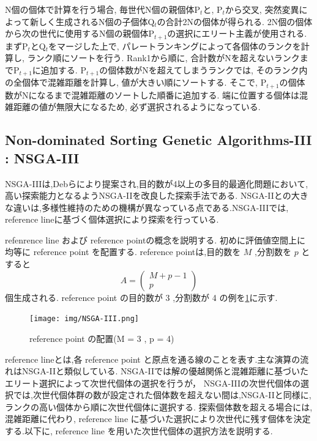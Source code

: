 \documentclass[12pt,a4j,notitlepage]{jreport}
\begin{document}
N個の個体で計算を行う場合, 毎世代N個の親個体P$_t$と, P$_t$から交叉, 突然変異によって新しく生成されるN個の子個体Q$_t$の合計2Nの個体が得られる.
2N個の個体から次の世代に使用するN個の親個体P$_{t+1}$の選択にエリート主義が使用される.
まずP$_t$とQ$_t$をマージした上で, パレートランキングによって各個体のランクを計算し, ランク順にソートを行う.
Rank1から順に, 合計数がNを超えないランクまでP$_{t+1}$に追加する.
P$_{t+1}$の個体数がNを超えてしまうランクでは, そのランク内の全個体で混雑距離を計算し, 値が大きい順にソートする.
そこで, P$_{t+1}$の個体数がNになるまで混雑距離のソートした順番に追加する.
端に位置する個体は混雑距離の値が無限大になるため, 必ず選択されるようになっている.

\subsection{Non-dominated Sorting Genetic Algorithms-III : NSGA-III}

NSGA-III\cite{Jain}は,Debらにより提案され,目的数が4以上の多目的最適化問題において,高い探索能力となるようNSGA-IIを改良した探索手法である.
NSGA-IIとの大きな違いは,多様性維持のための機構が異なっている点である.NSGA-IIIでは, reference lineに基づく個体選択により探索を行っている.

refenrence line および reference pointの概念を説明する.
初めに評価値空間上に均等に reference point を配置する. reference pointは,目的数を $M$ ,分割数を $p$ とすると
\[
  A = \left(
    \begin{array}{cc}
      M + p - 1 \\
            p
    \end{array}
  \right)
\]
個生成される. reference point の目的数が 3 ,分割数が 4 の例を\ref{fig:nsgaiii}に示す.
 \begin{figure}[htbp]
	\begin{center}
		\texttt{[image: img/NSGA-III.png]}
             		\setlength{\abovecaptionskip}{0mm}
		\setlength{\belowcaptionskip}{0mm}
			\caption{reference point の配置(M = 3 , p = 4)}
	\label{fig:nsgaiii}
	\end{center}
\end{figure}

reference lineとは,各 reference point と原点を通る線のことを表す.主な演算の流れはNSGA-IIと類似している.
NSGA-IIでは解の優越関係と混雑距離に基づいたエリート選択によって次世代個体の選択を行うが，
NSGA-IIIの次世代個体の選択では,次世代個体群の数が設定された個体数を超えない間は,NSGA-IIと同様に,ランクの高い個体から順に次世代個体に選択する.
探索個体数を超える場合には,混雑距離に代わり, reference line に基づいた選択により次世代に残す個体を決定する.以下に, reference line を用いた次世代個体の選択方法を説明する.
\end{document}
